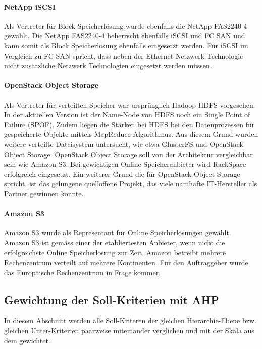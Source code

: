 \paragraph{NetApp iSCSI}\label{Al-3}
Als Vertreter für Block Speicherlösung wurde ebenfalls die NetApp FAS2240-4 gewählt. Die NetApp FAS2240-4 beherrscht ebenfalls iSCSI und FC SAN und kann somit als Block Speicherlösung ebenfalls eingesetzt werden. Für iSCSI im Vergleich zu FC-SAN spricht, dass neben der Ethernet-Netzwerk Technologie nicht zusätzliche Netzwerk Technologien eingesetzt werden müssen.

\paragraph{OpenStack Object Storage}\label{Al-4}

Als Vertreter für verteilten Speicher war ursprünglich Hadoop HDFS vorgesehen. In der aktuellen Version ist der Name-Node von HDFS noch ein Single Point of Failure (SPOF). Zudem liegen die Stärken bei HDFS bei den Datenprozessen für gespeicherte Objekte mittels MapReduce Algorithmus. Aus diesem Grund wurden weitere verteilte Dateisystem untersucht, wie etwa GlusterFS und OpenStack Object Storage. OpenStack Object Storage soll von der Architektur vergleichbar sein wie Amazon S3. Bei gewichtigen Online Speicheranbieter wird RackSpace erfolgreich eingesetzt. Ein weiterer Grund die für OpenStack Object Storage spricht, ist das gelungene quelloffene Projekt, das viele namhafte IT-Hersteller als Partner gewinnen konnte.

\paragraph{Amazon S3}\label{Al-5}
Amazon S3 wurde als Representant für Online Speicherlösungen gewählt. Amazon S3 ist gemäss  einer der etabliertesten Anbieter, wenn nicht die erfolgreichste Online Speicherlösung zur Zeit. Amazon betreibt mehrere Rechenzentrum verteilt auf mehrere Kontinenten. Für den Auftraggeber würde das Europäische Rechenzentrum in Frage kommen.


\subsection{Gewichtung der Soll-Kriterien mit AHP}

In diesem Abschnitt werden alle Soll-Kriteren der gleichen Hierarchie-Ebene bzw. gleichen Unter-Kriterien paarweise miteinander verglichen und mit der Skala  aus dem  gewichtet.

